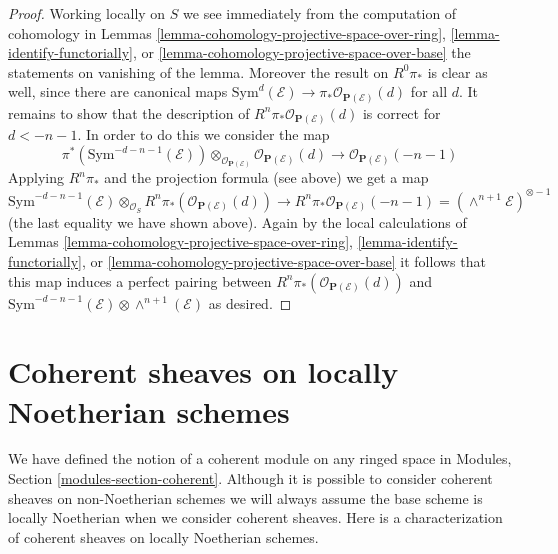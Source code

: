 \documentclass{stacks-project}
\theoremstyle{plain}
\theoremstyle{definition}
\theoremstyle{remark}
\numberwithin{equation}{subsection}
\begin{document}
\begin{proof}
\medskip\noindent
Working locally on $S$ we see immediately from the computation of
cohomology in Lemmas \ref{lemma-cohomology-projective-space-over-ring},
\ref{lemma-identify-functorially}, or
\ref{lemma-cohomology-projective-space-over-base} the statements on
vanishing of the lemma. Moreover the result on $R^0\pi_*$ is clear
as well, since there are canonical maps
$\text{Sym}^d(\mathcal{E}) \to \pi_* \mathcal{O}_{\mathbf{P}(\mathcal{E})}(d)$
for all $d$. It remains to show that the description of
$R^n\pi_*\mathcal{O}_{\mathbf{P}(\mathcal{E})}(d)$ is correct
for $d < -n - 1$. In order to do this we consider the map
$$
\pi^*(\text{Sym}^{-d - n - 1}(\mathcal{E}))
\otimes_{\mathcal{O}_{\mathbf{P}(\mathcal{E})}}
\mathcal{O}_{\mathbf{P}(\mathcal{E})}(d)
\longrightarrow
\mathcal{O}_{\mathbf{P}(\mathcal{E})}(-n - 1)
$$
Applying $R^n\pi_*$ and the projection formula (see above) we get a map
$$
\text{Sym}^{-d - n - 1}(\mathcal{E})
\otimes_{\mathcal{O}_S}
R^n\pi_*(\mathcal{O}_{\mathbf{P}(\mathcal{E})}(d))
\longrightarrow
R^n\pi_*\mathcal{O}_{\mathbf{P}(\mathcal{E})}(-n - 1) =
(\wedge^{n + 1}\mathcal{E})^{\otimes -1}
$$
(the last equality we have shown above).
Again by the local calculations of Lemmas
\ref{lemma-cohomology-projective-space-over-ring},
\ref{lemma-identify-functorially}, or
\ref{lemma-cohomology-projective-space-over-base}
it follows that this map induces a perfect pairing between
$R^n\pi_*(\mathcal{O}_{\mathbf{P}(\mathcal{E})}(d))$ and
$\text{Sym}^{-d - n - 1}(\mathcal{E}) \otimes \wedge^{n + 1}(\mathcal{E})$
as desired.
\end{proof}

















\section{Coherent sheaves on locally Noetherian schemes}
\label{section-coherent-sheaves}

\noindent
We have defined the notion of a coherent module on any ringed space in
Modules, Section \ref{modules-section-coherent}.
Although it is possible to consider coherent sheaves on non-Noetherian
schemes we will always assume the base scheme is locally Noetherian when
we consider coherent sheaves. Here is a characterization of coherent
sheaves on locally Noetherian schemes.
\end{document}
